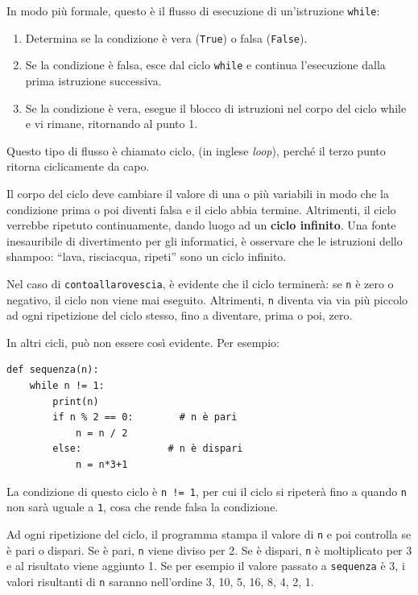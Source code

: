 \documentclass[10pt]{book}
\begin{document}
In modo più formale, questo è il flusso di esecuzione di un'istruzione {\tt while}:

\begin{enumerate}

\item Determina se la condizione è vera ({\tt True}) o falsa ({\tt False}).

\item Se la condizione è falsa, esce dal ciclo {\tt while} e continua l'esecuzione dalla prima istruzione successiva.

\item Se la condizione è vera, esegue il blocco di istruzioni nel corpo del ciclo while e vi rimane, ritornando al punto 1.

\end{enumerate}

Questo tipo di flusso è chiamato ciclo, (in inglese {\em loop}), perché il terzo punto ritorna ciclicamente da capo. 

Il corpo del ciclo deve cambiare il valore di una o più variabili in modo che la condizione prima o poi diventi falsa e il ciclo abbia termine. Altrimenti, il ciclo verrebbe ripetuto continuamente, dando luogo ad un {\bf ciclo infinito}. Una fonte inesauribile di divertimento per gli informatici, è osservare che le istruzioni dello shampoo:
``lava, risciacqua, ripeti'' sono un ciclo infinito.


Nel caso di {\tt contoallarovescia}, è evidente che il ciclo terminerà: se {\tt n} è zero o negativo, il ciclo non viene mai eseguito. Altrimenti, {\tt n} diventa via via più piccolo ad ogni ripetizione del ciclo stesso, fino a diventare, prima o poi, zero. 

In altri cicli, può non essere così evidente. Per esempio:

\begin{verbatim}
def sequenza(n):
    while n != 1:
        print(n)
        if n % 2 == 0:        # n è pari
            n = n / 2
        else:               # n è dispari
            n = n*3+1
\end{verbatim}
%
La condizione di questo ciclo è {\tt n != 1}, per cui il ciclo si ripeterà
fino a quando {\tt n} non sarà uguale a {\tt 1}, cosa che rende falsa la condizione.

Ad ogni ripetizione del ciclo, il programma stampa il valore di {\tt n} e poi controlla se è pari o dispari. Se è pari, {\tt n} viene diviso per 2. Se è dispari, {\tt n} è moltiplicato per 3 e al risultato viene aggiunto 1. Se per esempio il valore passato a {\tt sequenza} è 3, i valori risultanti di {\tt n} saranno nell'ordine 3, 10, 5, 16, 8, 4, 2, 1.
\end{document}
